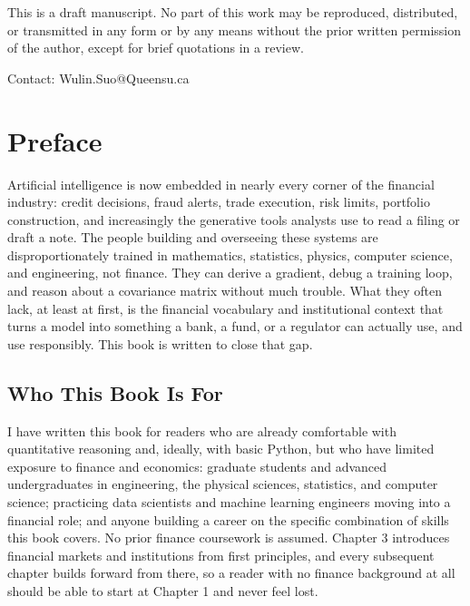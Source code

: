 \documentclass{book}
\begin{document}
\noindent This is a draft manuscript. No part of this work may be reproduced, distributed, or transmitted in any form or by any means without the prior written permission of the author, except for brief quotations in a review.

\noindent Contact: Wulin.Suo@Queensu.ca
\vspace*{\fill}
\clearpage

\tableofcontents

\clearpage
{}
\chapter*{Preface}

Artificial intelligence is now embedded in nearly every corner of the financial industry: credit decisions, fraud alerts, 
trade execution, risk limits, portfolio construction, and increasingly the generative tools analysts use to read a filing 
or draft a note. The people building and overseeing these systems are disproportionately trained in mathematics, statistics,
 physics, computer science, and engineering, not finance. They can derive a gradient, debug a training loop, and reason 
 about a covariance matrix without much trouble. What they often lack, at least at first, is the financial vocabulary and 
 institutional context that turns a model into something a bank, a fund, or a regulator can actually use, and use 
 responsibly. This book is written to close that gap.

\section*{Who This Book Is For}

I have written this book for readers who are already comfortable with quantitative reasoning and, ideally, with basic 
Python, but who have limited exposure to finance and economics: graduate students and advanced undergraduates in 
engineering, the physical sciences, statistics, and computer science; practicing data scientists and machine learning 
engineers moving into a financial role; and anyone building a career on the specific combination of skills this book 
covers. No prior finance coursework is assumed. Chapter 3 introduces financial markets and institutions from first 
principles, and every subsequent chapter builds forward from there, so a reader with no finance background at all should be able to start at Chapter 1 and never feel lost.
\end{document}
